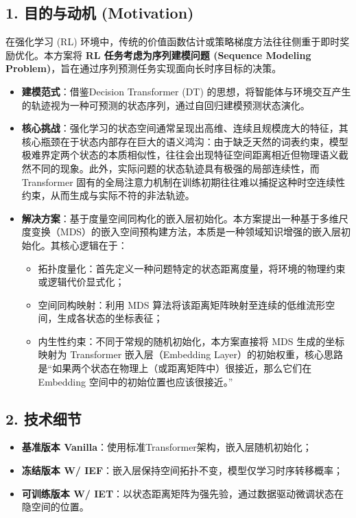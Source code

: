 \documentclass[UTF8]{ctexart}
\begin{document}
\subsection*{1. 目的与动机 (Motivation)}
在强化学习 (RL) 环境中，传统的价值函数估计或策略梯度方法往往侧重于即时奖励优化。本方案将 \textbf{RL 任务考虑为序列建模问题 (Sequence Modeling Problem)}，旨在通过序列预测任务实现面向长时序目标的决策。
\begin{itemize}
    \item \textbf{建模范式}：借鉴Decision Transformer (DT) 的思想，将智能体与环境交互产生的轨迹视为一种可预测的状态序列，通过自回归建模预测状态演化。
    \item \textbf{核心挑战}：强化学习的状态空间通常呈现出高维、连续且规模庞大的特征，其核心瓶颈在于状态内部存在巨大的语义鸿沟：由于缺乏天然的词表约束，模型极难界定两个状态的本质相似性，往往会出现特征空间距离相近但物理语义截然不同的现象。此外，实际问题的状态轨迹具有极强的局部连续性，而 Transformer 固有的全局注意力机制在训练初期往往难以捕捉这种时空连续性约束，从而生成与实际不符的非法轨迹。
    \item \textbf{解决方案}：基于度量空间同构化的嵌入层初始化。本方案提出一种基于多维尺度变换（MDS）的嵌入空间预构建方法，本质是一种领域知识增强的嵌入层初始化。其核心逻辑在于：
    \begin{itemize}
        \item 拓扑度量化：首先定义一种问题特定的状态距离度量，将环境的物理约束或逻辑代价显式化；
        \item 空间同构映射：利用 MDS 算法将该距离矩阵映射至连续的低维流形空间，生成各状态的坐标表征；
        \item 内生性约束：不同于常规的随机初始化，本方案直接将 MDS 生成的坐标映射为 Transformer 嵌入层（Embedding Layer）的初始权重，核心思路是“如果两个状态在物理上（或距离矩阵中）很接近，那么它们在 Embedding 空间中的初始位置也应该很接近。”
    \end{itemize}
\end{itemize}

\subsection*{2. 技术细节}
\begin{itemize}
        \item \textbf{基准版本 Vanilla}：使用标准Transformer架构，嵌入层随机初始化；
        \item \textbf{冻结版本 W/ IEF}：嵌入层保持空间拓扑不变，模型仅学习时序转移概率；
        \item \textbf{可训练版本 W/ IET}：以状态距离矩阵为强先验，通过数据驱动微调状态在隐空间的位置。
    \end{itemize}
\end{document}
